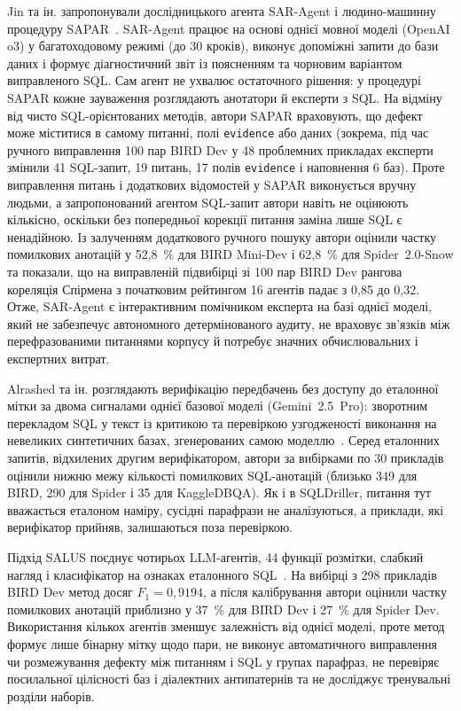 \documentclass[a4paper,14pt,oneside]{extreport}
\begin{document}
Jin та ін. запропонували дослідницького агента SAR-Agent і людино-машинну процедуру SAPAR~\cite{jin2026annotation}. SAR-Agent працює на основі однієї мовної моделі (OpenAI o3) у багатоходовому режимі (до 30 кроків), виконує допоміжні запити до бази даних і формує діагностичний звіт із поясненням та чорновим варіантом виправленого SQL. Сам агент не ухвалює остаточного рішення: у процедурі SAPAR кожне зауваження розглядають анотатори й експерти з SQL. На відміну від чисто SQL-орієнтованих методів, автори SAPAR враховують, що дефект може міститися в самому питанні, полі \texttt{evidence} або даних (зокрема, під час ручного виправлення 100 пар BIRD Dev у 48 проблемних прикладах експерти змінили 41 SQL-запит, 19 питань, 17 полів \texttt{evidence} і наповнення 6 баз). Проте виправлення питань і додаткових відомостей у SAPAR виконується вручну людьми, а запропонований агентом SQL-запит автори навіть не оцінюють кількісно, оскільки без попередньої корекції питання заміна лише SQL є ненадійною. Із залученням додаткового ручного пошуку автори оцінили частку помилкових анотацій у 52,8~\% для BIRD Mini-Dev і 62,8~\% для Spider~2.0-Snow та показали, що на виправленій підвибірці зі 100 пар BIRD Dev рангова кореляція Спірмена з початковим рейтингом 16 агентів падає з 0,85 до 0,32. Отже, SAR-Agent є інтерактивним помічником експерта на базі однієї моделі, який не забезпечує автономного детермінованого аудиту, не враховує зв’язків між перефразованими питаннями корпусу й потребує значних обчислювальних і експертних витрат.

Alrashed та ін. розглядають верифікацію передбачень без доступу до еталонної мітки за двома сигналами однієї базової моделі (Gemini~2.5~Pro): зворотним перекладом SQL у текст із критикою та перевіркою узгодженості виконання на невеликих синтетичних базах, згенерованих самою моделлю~\cite{alrashed2026verification}. Серед еталонних запитів, відхилених другим верифікатором, автори за вибірками по 30 прикладів оцінили нижню межу кількості помилкових SQL-анотацій (близько 349 для BIRD, 290 для Spider і 35 для KaggleDBQA). Як і в SQLDriller, питання тут вважається еталоном наміру, сусідні парафрази не аналізуються, а приклади, які верифікатор прийняв, залишаються поза перевіркою.

Підхід SALUS поєднує чотирьох LLM-агентів, 44 функції розмітки, слабкий нагляд і класифікатор на ознаках еталонного SQL~\cite{zhou2026salus}. На вибірці з 298 прикладів BIRD Dev метод досяг \(F_1=0{,}9194\), а після калібрування автори оцінили частку помилкових анотацій приблизно у 37~\% для BIRD Dev і 27~\% для Spider Dev. Використання кількох агентів зменшує залежність від однієї моделі, проте метод формує лише бінарну мітку щодо пари, не виконує автоматичного виправлення чи розмежування дефекту між питанням і SQL у групах парафраз, не перевіряє посилальної цілісності баз і діалектних антипатернів та не досліджує тренувальні розділи наборів.
\end{document}

